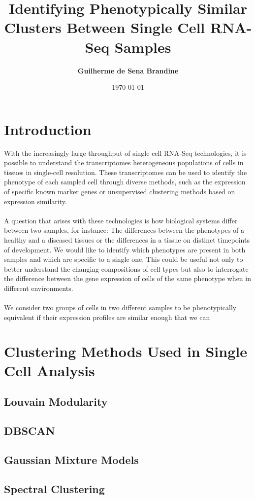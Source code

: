 \documentclass[11pt]{article}
\title{\bf Identifying Phenotypically Similar Clusters Between Single Cell RNA-Seq Samples}
\author{\bf Guilherme de Sena Brandine}
\date{\today}
\begin{document}
\maketitle

\section{Introduction}
With the increasingly large throughput of single cell RNA-Seq technologies, it is possible to understand the transcriptomes heterogeneous populations of cells in tissues in single-cell resolution. These transcriptomes can be used to identify the phenotype of each sampled cell through diverse methods, such as the expression of specific known marker genes or unsupervised clustering methods based on expression similarity. \\
\\
A question that arises with these technologies is how biological systems differ between two samples, for instance: The differences between the phenotypes of a healthy and a diseased tissues or the differences in a tissue on distinct timepoints of development. We would like to identify which phenotypes are present in  both samples and which are specific to a single one. This could be useful not only to better understand the changing compositions of cell types but also to interrogate the difference between the gene expression of cells of the same phenotype when in different environments. \\
\\
We consider two groups of cells in two different samples to be phenotypically equivalent if their expression profiles are similar enough that we can 

\section{Clustering Methods Used in Single Cell Analysis}
\subsection{Louvain Modularity}
\subsection{DBSCAN}
\subsection{Gaussian Mixture Models}
\subsection{Spectral Clustering}
\end{document}
